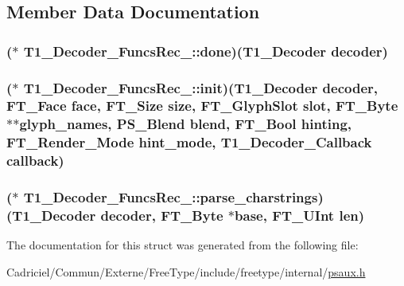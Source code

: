 \subsection{Member Data Documentation}
\hypertarget{struct_t1___decoder___funcs_rec___a2d76ed11eab173c09dc8f5cde75a64ee}{
\subsubsection[{done}]{($\ast$ T1\-\_\-\-Decoder\-\_\-\-Funcs\-Rec\-\_\-\-::done)({\bf T1\-\_\-\-Decoder} decoder)}}\label{struct_t1___decoder___funcs_rec___a2d76ed11eab173c09dc8f5cde75a64ee}
\hypertarget{struct_t1___decoder___funcs_rec___a10baf5f433631fb6e73e639fca7e9478}{
\subsubsection[{init}]{($\ast$ T1\-\_\-\-Decoder\-\_\-\-Funcs\-Rec\-\_\-\-::init)({\bf T1\-\_\-\-Decoder} decoder, {\bf F\-T\-\_\-\-Face} {\bf face}, {\bf F\-T\-\_\-\-Size} {\bf size}, {\bf F\-T\-\_\-\-Glyph\-Slot} slot, {\bf F\-T\-\_\-\-Byte} $\ast$$\ast$glyph\-\_\-names, {\bf P\-S\-\_\-\-Blend} blend, {\bf F\-T\-\_\-\-Bool} hinting, {\bf F\-T\-\_\-\-Render\-\_\-\-Mode} hint\-\_\-mode, {\bf T1\-\_\-\-Decoder\-\_\-\-Callback} callback)}}\label{struct_t1___decoder___funcs_rec___a10baf5f433631fb6e73e639fca7e9478}
\hypertarget{struct_t1___decoder___funcs_rec___a921b7ac2c00f97c425643c5a612b3c38}{
\subsubsection[{parse\-\_\-charstrings}]{($\ast$ T1\-\_\-\-Decoder\-\_\-\-Funcs\-Rec\-\_\-\-::parse\-\_\-charstrings)({\bf T1\-\_\-\-Decoder} decoder, {\bf F\-T\-\_\-\-Byte} $\ast$base, {\bf F\-T\-\_\-\-U\-Int} {\bf len})}}\label{struct_t1___decoder___funcs_rec___a921b7ac2c00f97c425643c5a612b3c38}


The documentation for this struct was generated from the following file\-:\begin{DoxyCompactItemize}
\item 
Cadriciel/\-Commun/\-Externe/\-Free\-Type/include/freetype/internal/\hyperlink{psaux_8h}{psaux.\-h}\end{DoxyCompactItemize}
